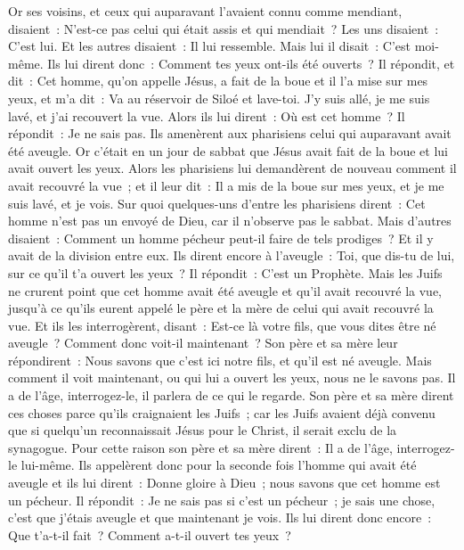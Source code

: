 \begin{multicols}{2}
Or ses voisins, et ceux qui auparavant l'avaient connu comme mendiant, disaient~: N'est-ce pas celui qui était assis et qui mendiait~?
Les uns disaient~: C'est lui. Et les autres disaient~: Il lui ressemble. Mais lui il disait~: C'est moi-même.
Ils lui dirent donc~: Comment tes yeux ont-ils été ouverts~?
Il répondit, et dit~: Cet homme, qu'on appelle Jésus, a fait de la boue et il l'a mise sur mes yeux, et m'a dit~: Va au réservoir de Siloé et lave-toi. J'y suis allé, je me suis lavé, et j'ai recouvert la vue.
Alors ils lui dirent~: Où est cet homme~? Il répondit~: Je ne sais pas.
Ils amenèrent aux pharisiens celui qui auparavant avait été aveugle.
Or c'était en un jour de sabbat que Jésus avait fait de la boue et lui avait ouvert les yeux.
Alors les pharisiens lui demandèrent de nouveau comment il avait recouvré la vue~; et il leur dit~: Il a mis de la boue sur mes yeux, et je me suis lavé, et je vois.
Sur quoi quelques-uns d'entre les pharisiens dirent~: Cet homme n'est pas un envoyé de Dieu, car il n'observe pas le sabbat. Mais d'autres disaient~: Comment un homme pécheur peut-il faire de tels prodiges~? Et il y avait de la division entre eux.
Ils dirent encore à l'aveugle~: Toi, que dis-tu de lui, sur ce qu'il t'a ouvert les yeux~? Il répondit~: C'est un Prophète.
Mais les Juifs ne crurent point que cet homme avait été aveugle et qu'il avait recouvré la vue, jusqu'à ce qu'ils eurent appelé le père et la mère de celui qui avait recouvré la vue.
Et ils les interrogèrent, disant~: Est-ce là votre fils, que vous dites être né aveugle~? Comment donc voit-il maintenant~?
Son père et sa mère leur répondirent~: Nous savons que c'est ici notre fils, et qu'il est né aveugle.
Mais comment il voit maintenant, ou qui lui a ouvert les yeux, nous ne le savons pas. Il a de l'âge, interrogez-le, il parlera de ce qui le regarde.
Son père et sa mère dirent ces choses parce qu'ils craignaient les Juifs~; car les Juifs avaient déjà convenu que si quelqu'un reconnaissait Jésus pour le Christ, il serait exclu de la synagogue.
Pour cette raison son père et sa mère dirent~: Il a de l'âge, interrogez-le lui-même.
Ils appelèrent donc pour la seconde fois l'homme qui avait été aveugle et ils lui dirent~: Donne gloire à Dieu~; nous savons que cet homme est un pécheur.
Il répondit~: Je ne sais pas si c'est un pécheur~; je sais une chose, c'est que j'étais aveugle et que maintenant je vois.
Ils lui dirent donc encore~: Que t'a-t-il fait~? Comment a-t-il ouvert tes yeux~?

\end{multicols}
